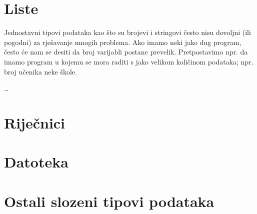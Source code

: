 \section{Liste}

Jednostavni tipovi podataka kao što su brojevi i stringovi
često nisu dovoljni (ili pogodni) za rješavanje mnogih
problema. Ako imamo neki jako dug program, često će nam se
desiti da broj varijabli postane prevelik. Pretpostavimo npr. da
imamo program u kojemu se mora raditi s jako velikom količinom
podataka; npr. broj učenika neke škole.

\dots

\section{Riječnici}

\section{Datoteka}

\section{Ostali slozeni tipovi podataka}
